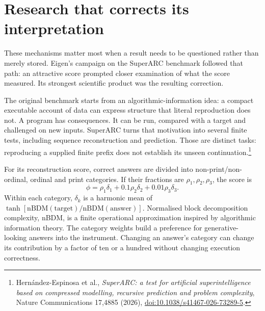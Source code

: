 \section{Research that corrects its interpretation}
\label{section:research-that-can-inspect-its-own-results}

These mechanisms matter most when a result needs to be questioned rather than merely stored. Eigen's campaign on the SuperARC benchmark followed that path: an attractive score prompted closer examination of what the score measured. Its strongest scientific product was the resulting correction.

The original benchmark starts from an algorithmic-information idea: a compact executable account of data can express structure that literal reproduction does not. A program has consequences. It can be run, compared with a target and challenged on new inputs. SuperARC turns that motivation into several finite tests, including sequence reconstruction and prediction. Those are distinct tasks: reproducing a supplied finite prefix does not establish its unseen continuation.\footnote{Hern\'andez-Espinosa et al., \emph{SuperARC: a test for artificial superintelligence based on compressed modelling, recursive prediction and problem complexity}, Nature Communications 17,4885 (2026), \href{https://doi.org/10.1038/s41467-026-73289-5}{doi:10.1038/s41467-026-73289-5}.}~\cite{HernndezEspinosa2026c672f1}

For its reconstruction score, correct answers are divided into non-print/non-ordinal, ordinal and print categories. If their fractions are $\rho_1,\rho_2,\rho_3$, the score is
\begin{equation}
 \phi=\rho_1\delta_1+0.1\rho_2\delta_2+0.01\rho_3\delta_3.
 \label{eq:superarc-score}
\end{equation}
Within each category, $\delta_k$ is a harmonic mean of $\tanh[\mathrm{nBDM}(\mathrm{target})/\mathrm{nBDM}(\mathrm{answer})]$. Normalised block decomposition complexity, nBDM, is a finite operational approximation inspired by algorithmic information theory. The category weights build a preference for generative-looking answers into the instrument. Changing an answer's category can change its contribution by a factor of ten or a hundred without changing execution correctness.

